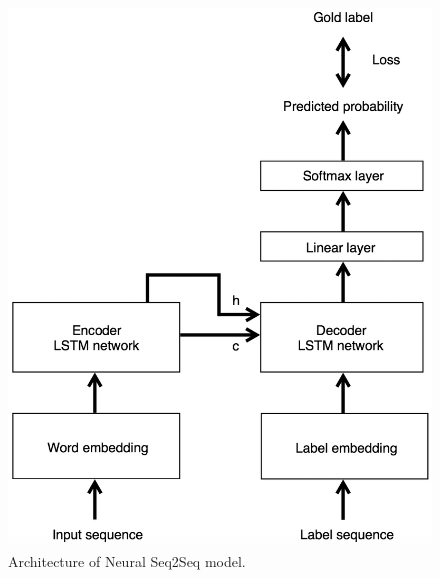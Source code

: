 \documentclass[11pt,a4paper]{article}
\begin{document}
\begin{figure}[ht]
\centering
\includegraphics[width=0.6\linewidth]{fig_architecture}
\caption{Architecture of Neural Seq2Seq model.}
\label{fig:fig_architecture}
\end{figure}

\end{document}
